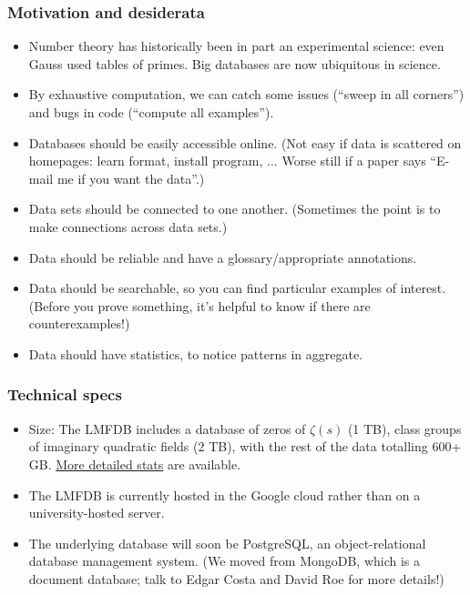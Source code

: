 \documentclass[xcolor=dvipsnames]{beamer}
\theoremstyle{plain}
\begin{document}
\begin{frame}[plain]
\frametitle{Motivation and desiderata} \pause

\begin{itemize}
\item Number theory has historically been in part an experimental science: even Gauss used tables of primes.  \pause  Big databases are now ubiquitous in science.  \pause
\item By exhaustive computation, we can catch some issues (``sweep in all corners'') and bugs in code (``compute all examples''). \pause
\item Databases should be easily accessible online.  \pause  (Not easy if data is scattered on homepages: learn format, install program, ...  Worse still if a paper says ``E-mail me if you want the data''.) \pause 
\item Data sets should be connected to one another.  \pause (Sometimes the point is to make connections across data sets.) \pause
\item Data should be reliable and have a glossary/appropriate annotations. \pause
\item Data should be searchable, so you can find particular examples of interest. \pause (Before you prove something, it's helpful to know if there are counterexamples!) \pause
\item Data should have statistics, to notice patterns in aggregate.
\end{itemize}
\end{frame}

\begin{frame}[plain]
\frametitle{Technical specs} \pause

\begin{itemize}
\item Size: The LMFDB includes a database of zeros of $\zeta(s)$ (1 TB), class groups of imaginary quadratic fields (2 TB), with the rest of the data totalling 600+ GB.  \href{http://cmfs.lmfdb.xyz/api/stats}{More detailed stats} are available. \pause
\item The LMFDB is currently hosted in the Google cloud rather than on a university-hosted server.  \pause
\item The underlying database will soon be PostgreSQL, an object-relational database management system.  \pause  (We moved from MongoDB, which is a document database; talk to Edgar Costa and David Roe for more details!)  
\end{itemize}
\end{frame}
\end{document}
